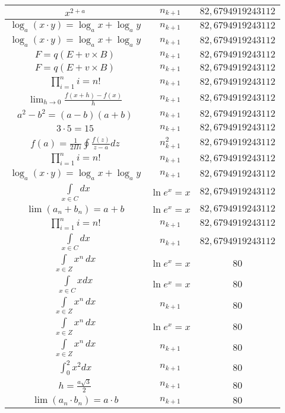 \documentclass{article}
\begin{document}
\begin{flushleft}
\begin{longtable}{|c|c|c|}
$x^{2+a}$ & $n_{k+1}$ & $82,6794919243112$ \\ \hline 
$\log_{a}(x\cdot y)=\log_{a}x+\log_{a}y$ & $n_{k+1}$ & $82,6794919243112$ \\ \hline 
$\log_{a}(x\cdot y)=\log_{a}x+\log_{a}y$ & $n_{k+1}$ & $82,6794919243112$ \\ \hline 
$F=q\left(E+v\times B\right)$ & $n_{k+1}$ & $82,6794919243112$ \\ \hline 
$F=q\left(E+v\times B\right)$ & $n_{k+1}$ & $82,6794919243112$ \\ \hline 
$\prod_{i=1}^ni=n!$ & $n_{k+1}$ & $82,6794919243112$ \\ \hline 
$\lim_{h\to0}\frac{f(x+h)-f(x)}{h}$ & $n_{k+1}$ & $82,6794919243112$ \\ \hline 
$a^2-b^2=(a-b)(a+b)$ & $n_{k+1}$ & $82,6794919243112$ \\ \hline 
$3\cdot 5=15$ & $n_{k+1}$ & $82,6794919243112$ \\ \hline 
$f\left(a\right)=\frac{1}{2\Pi i}\oint\frac{f\left(z\right)}{z-a}dz$ & $n_{k+1}^2$ & $82,6794919243112$ \\ \hline 
$\prod_{i=1}^ni=n!$ & $n_{k+1}$ & $82,6794919243112$ \\ \hline 
$\log_{a}(x\cdot y)=\log_{a}x+\log_{a}y$ & $n_{k+1}$ & $82,6794919243112$ \\ \hline 
$\int \limits_{x\in C}dx$ & $\ln e^x=x$ & $82,6794919243112$ \\ \hline 
$\lim\left(a_n+b_n\right)=a+b$ & $\ln e^x=x$ & $82,6794919243112$ \\ \hline 
$\prod_{i=1}^ni=n!$ & $n_{k+1}$ & $82,6794919243112$ \\ \hline 
$\int \limits_{x\in C}dx$ & $n_{k+1}$ & $82,6794919243112$ \\ \hline 
$\int \limits_{x\in Z}\!x^{n}\,dx$ & $\ln e^x=x$ & $80$ \\ \hline 
$\int \limits_{x\in C}xdx$ & $\ln e^x=x$ & $80$ \\ \hline 
$\int \limits_{x\in Z}\!x^{n}\,dx$ & $n_{k+1}$ & $80$ \\ \hline 
$\int \limits_{x\in Z}\!x^{n}\,dx$ & $\ln e^x=x$ & $80$ \\ \hline 
$\int \limits_{x\in Z}\!x^{n}\,dx$ & $n_{k+1}$ & $80$ \\ \hline 
$\int _0^2x^2dx$ & $n_{k+1}$ & $80$ \\ \hline 
$h=\frac{a\sqrt{3}}{2}$ & $n_{k+1}$ & $80$ \\ \hline 
$\lim\left(a_n\cdot b_n\right)=a\cdot b$ & $n_{k+1}$ & $80$ \\ \hline 

\end{longtable}
\end{flushleft}
\end{document}
